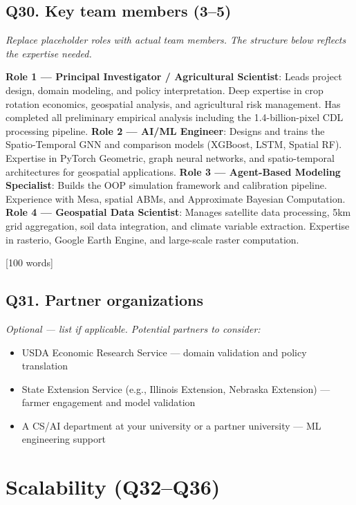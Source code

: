 \documentclass[11pt,letterpaper]{article}
\newcommand{\answer}[1]{%
    \vspace{0.2em}%
    \noindent\colorbox{answerbox}{\parbox{\dimexpr\textwidth-2\fboxsep}{%
        \vspace{0.4em}#1\vspace{0.4em}%
    }}%
    \vspace{0.5em}%
}
\newcommand{\note}[1]{%
    \vspace{0.2em}%
    {\small\textcolor{notegray}{\textit{#1}}}%
    \vspace{0.2em}%
}
\newcommand{\wordcount}[1]{%
    \hfill{\scriptsize\textcolor{notegray}{[#1 words]}}%
}
\begin{document}
\subsection{Q30. Key team members (3--5)}
\note{Replace placeholder roles with actual team members. The structure below reflects the expertise needed.}

\answer{\textbf{Role 1 --- Principal Investigator / Agricultural Scientist}: Leads project design, domain modeling, and policy interpretation. Deep expertise in crop rotation economics, geospatial analysis, and agricultural risk management. Has completed all preliminary empirical analysis including the 1.4-billion-pixel CDL processing pipeline. \textbf{Role 2 --- AI/ML Engineer}: Designs and trains the Spatio-Temporal GNN and comparison models (XGBoost, LSTM, Spatial RF). Expertise in PyTorch Geometric, graph neural networks, and spatio-temporal architectures for geospatial applications. \textbf{Role 3 --- Agent-Based Modeling Specialist}: Builds the OOP simulation framework and calibration pipeline. Experience with Mesa, spatial ABMs, and Approximate Bayesian Computation. \textbf{Role 4 --- Geospatial Data Scientist}: Manages satellite data processing, 5km grid aggregation, soil data integration, and climate variable extraction. Expertise in rasterio, Google Earth Engine, and large-scale raster computation.}
\wordcount{100}

\subsection{Q31. Partner organizations}
\note{Optional --- list if applicable. Potential partners to consider:}
\begin{itemize}[nosep]
    \item USDA Economic Research Service --- domain validation and policy translation
    \item State Extension Service (e.g., Illinois Extension, Nebraska Extension) --- farmer engagement and model validation
    \item A CS/AI department at your university or a partner university --- ML engineering support
\end{itemize}

\section{Scalability (Q32--Q36)}
\end{document}
